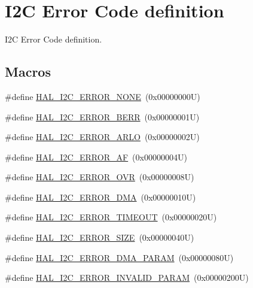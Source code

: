 \hypertarget{group___i2_c___error___code__definition}{}\section{I2C Error Code definition}
\label{group___i2_c___error___code__definition}


I2C Error Code definition.  


\subsection*{Macros}
\begin{DoxyCompactItemize}
\item 
\#define \mbox{\hyperlink{group___i2_c___error___code__definition_ga0b8ca289091d942032c89484b6211d0d}{H\+A\+L\+\_\+\+I2\+C\+\_\+\+E\+R\+R\+O\+R\+\_\+\+N\+O\+NE}}~(0x00000000\+U)
\item 
\#define \mbox{\hyperlink{group___i2_c___error___code__definition_gab9f6e39431ee764ada50fd63f0ad2fbf}{H\+A\+L\+\_\+\+I2\+C\+\_\+\+E\+R\+R\+O\+R\+\_\+\+B\+E\+RR}}~(0x00000001\+U)
\item 
\#define \mbox{\hyperlink{group___i2_c___error___code__definition_ga048b36222884bfe80ce2d37fa868690b}{H\+A\+L\+\_\+\+I2\+C\+\_\+\+E\+R\+R\+O\+R\+\_\+\+A\+R\+LO}}~(0x00000002\+U)
\item 
\#define \mbox{\hyperlink{group___i2_c___error___code__definition_gad1cc236ad6ba5cafe66aecb0dbedc65a}{H\+A\+L\+\_\+\+I2\+C\+\_\+\+E\+R\+R\+O\+R\+\_\+\+AF}}~(0x00000004\+U)
\item 
\#define \mbox{\hyperlink{group___i2_c___error___code__definition_ga38d8f9beb4c681eba786f6154d4f594a}{H\+A\+L\+\_\+\+I2\+C\+\_\+\+E\+R\+R\+O\+R\+\_\+\+O\+VR}}~(0x00000008\+U)
\item 
\#define \mbox{\hyperlink{group___i2_c___error___code__definition_gae1091e9e82dcfcfef247b214a11c9db3}{H\+A\+L\+\_\+\+I2\+C\+\_\+\+E\+R\+R\+O\+R\+\_\+\+D\+MA}}~(0x00000010\+U)
\item 
\#define \mbox{\hyperlink{group___i2_c___error___code__definition_gaeb3bedf36d78ddf3284a68494ab9d089}{H\+A\+L\+\_\+\+I2\+C\+\_\+\+E\+R\+R\+O\+R\+\_\+\+T\+I\+M\+E\+O\+UT}}~(0x00000020\+U)
\item 
\#define \mbox{\hyperlink{group___i2_c___error___code__definition_ga98027ff2d2fda2c793b07168ded747a4}{H\+A\+L\+\_\+\+I2\+C\+\_\+\+E\+R\+R\+O\+R\+\_\+\+S\+I\+ZE}}~(0x00000040\+U)
\item 
\#define \mbox{\hyperlink{group___i2_c___error___code__definition_gacb922e1386469dce306f548cfd5c1277}{H\+A\+L\+\_\+\+I2\+C\+\_\+\+E\+R\+R\+O\+R\+\_\+\+D\+M\+A\+\_\+\+P\+A\+R\+AM}}~(0x00000080\+U)
\item 
\#define \mbox{\hyperlink{group___i2_c___error___code__definition_gac2d3acb9e918667866677dc6b3e92cd8}{H\+A\+L\+\_\+\+I2\+C\+\_\+\+E\+R\+R\+O\+R\+\_\+\+I\+N\+V\+A\+L\+I\+D\+\_\+\+P\+A\+R\+AM}}~(0x00000200\+U)
\end{DoxyCompactItemize}


